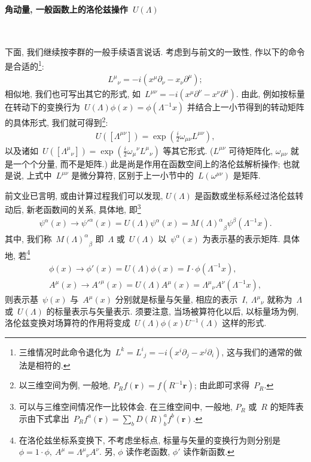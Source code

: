 \paragraph{角动量, 一般函数上的洛伦兹操作~$U(\Lambda)$}
~




下面, 我们继续按李群的一般手续语言说话. 考虑到与前文的一致性, 作以下的命令是合适的\footnote{三维情况时此命令退化为~$L^k={L^i}_j=-i(x^i\partial_j-x^j\partial_i)$, 这与我们的通常的做法是相符的.}:
\begin{align}
{L^\mu}_\nu=-i(x^\mu\partial_\nu-x_\nu\partial^\mu);
\end{align}
相似地, 我们也可写出其它的形式, 如~$L^{\mu\nu}=-i(x^\mu\partial^\nu-x^\nu\partial^\mu)$. 由此, 例如按标量在转动下的变换行为~$U(\Lambda)\phi(x)=\phi(\Lambda^{-1}x)$ 并结合上一小节得到的转动矩阵的具体形式, 我们就可得到\footnote{以三维空间为例, 一般地, $P_{R}f(\bm{r})=f(R^{-1}\bm{r})$; 由此即可求得~$P_R$.}:
\begin{align}
U([\Lambda^{\mu\nu}])=\exp\left(\frac{i}{2}\omega_{\mu\nu}L^{\mu\nu}\right),
\end{align}
以及诸如~$U([{\Lambda^\mu}_\nu])=\exp\left(\frac{i}{2}{\omega_\mu}^\nu{L^\mu}_\nu\right)$ 等其它形式. ($L^{\mu\nu}$ 可待矩阵化, $\omega_{\mu\nu}$ 就是一个个分量, 而不是矩阵.) 此是尚是作用在函数空间上的洛伦兹解析操作; 也就是说, 上式中~$L^{\mu\nu}$ 是微分算符, 区别于上一小节中的~$L(\omega^{\mu\nu})$ 是矩阵.

前文业已言明, 或由计算过程我们可以发现, $U(\Lambda)$ 是函数或坐标系经过洛伦兹转动后, 新老函数间的关系, 具体地, 即\footnote{可以与三维空间情况作一比较体会. 在三维空间中, 一般地, $P_R$ 或~$R$ 的矩阵表示由下式拿出~$P_Rf^a(\bm{r})=\sum_bD(R)^a_bf^b(\bm{r})$.}
\begin{gather}
\psi^\alpha(x)\rightarrow\psi'^\alpha(x)=U(\Lambda)\psi^\alpha(x)={M(\Lambda)^\alpha}_\beta\psi^\beta(\Lambda^{-1}x).
\end{gather}
其中, 我们称~${M(\Lambda)^\alpha}_\beta$ 即~$\Lambda$ 或~$U(\Lambda)$ 以~$\psi^\alpha(x)$ 为表示基的表示矩阵. 具体地, 若\footnote{在洛伦兹坐标系变换下, 不考虑坐标点, 标量与矢量的变换行为则分别是~$\phi=1\cdot\phi,~A^\mu={\Lambda^\mu}_\nu A^\nu$. 另, $\phi$ 读作老函数, $\phi'$ 读作新函数.}
\begin{gather}
\phi(x)\rightarrow\phi'(x)=U(\Lambda)\phi(x)=I\cdot\phi(\Lambda^{-1}x),\\
A^\mu(x)\rightarrow A'^\mu(x)=U(\Lambda)A^\mu(x)={\Lambda^\mu}_\nu A^\nu(\Lambda^{-1}x),
\end{gather}
则表示基~$\psi(x)$ 与~$A^\mu(x)$ 分别就是标量与矢量, 相应的表示~$I,~{\Lambda^\mu}_\nu$ 就称为~$\Lambda$ 或~$U(\Lambda)$ 的标量表示与矢量表示. 须要注意, 当场被算符化以后, 以标量场为例, 洛伦兹变换对场算符的作用将变成~$U(\Lambda)\phi(x)U^{-1}(\Lambda)$ 这样的形式.



